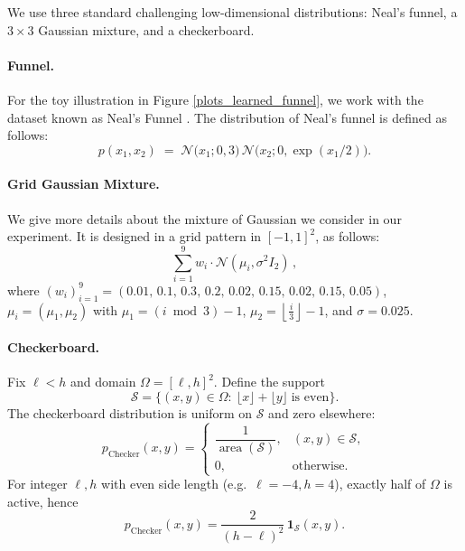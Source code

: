 \documentclass{article}
\theoremstyle{plain}
\theoremstyle{definition}
\theoremstyle{remark}
\begin{document}
We use three standard challenging low-dimensional distributions: Neal's funnel, a $3\times 3$ Gaussian mixture, and a checkerboard.

\paragraph{Funnel.}
For the toy illustration in Figure \ref{plots_learned_funnel}, we work with the dataset known as Neal's Funnel \cite{neal2003slice}. The distribution of Neal's funnel is defined as follows:
\begin{equation}
p(x_1, x_2) \;=\; \mathcal{N}\!\bigl(x_1; 0, 3\bigr)\,\mathcal{N}\!\bigl(x_2; 0, \exp(x_1/2)\bigr).
\end{equation}

\paragraph{Grid Gaussian Mixture.}
We give more details about the mixture of Gaussian we consider in our experiment. It is designed in a grid pattern in $[-1,1]^2$, as follows:
\[
\sum_{i=1}^{9} w_i \cdot \mathcal{N}(\mu_i,\sigma^2 I_2)\,,
\]
where $(w_i)_{i=1}^{9}=(0.01,\,0.1,\,0.3,\,0.2,\,0.02,\,0.15,\,0.02,\,0.15,\,0.05)$, $\mu_i=(\mu_1,\mu_2)$ with $\mu_1=(i \bmod 3)-1$, $\mu_2=\left\lfloor \frac{i}{3}\right\rfloor-1$, and $\sigma=0.025$.


\paragraph{Checkerboard.}
Fix $\ell<h$ and domain $\Omega=[\ell,h]^2$.  
Define the support
\[
\mathcal S = \bigl\{(x,y)\in\Omega:\ \lfloor x\rfloor + \lfloor y\rfloor \;\text{is even}\bigr\}.
\]
The checkerboard distribution is uniform on $\mathcal S$ and zero elsewhere:
\[
p_{\text{Checker}}(x,y) 
= \begin{cases}
\dfrac{1}{\operatorname{area}(\mathcal S)}, & (x,y)\in \mathcal S, \\[4pt]
0, & \text{otherwise}.
\end{cases}
\]
For integer $\ell,h$ with even side length (e.g.\ $\ell=-4,h=4$), exactly half of $\Omega$ is active, hence
\[
p_{\text{Checker}}(x,y)
= \frac{2}{(h-\ell)^2}\,\mathbf 1_{\mathcal S}(x,y).
\]
\end{document}
